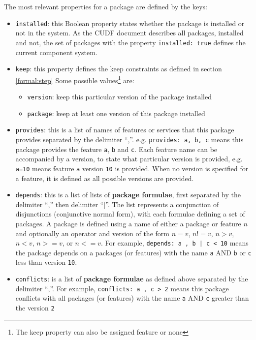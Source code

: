 The most relevant properties for a package are defined by the keys:
\begin{itemize}
  \item \verb+installed+: this Boolean property states whether the package is installed or not in the system. 
  As the CUDF document describes all packages, installed and not, the set of packages with the property \verb+installed: true+ defines the current component system.
  \item \verb+keep+: this property defines the keep constraints as defined in section \ref{formal:step}
  Some possible values\footnote{The keep property can also be assigned feature or none} are:
	  	\begin{itemize}
	  		\item \verb+version+: keep this particular version of the package installed
	  		\item \verb+package+: keep at least one version of this package installed
		\end{itemize}
  \item \verb+provides+: this is a list of names of features or services that this package provides separated by the delimiter ``,''.
  e.g. \verb+provides: a, b, c+ means this package provides the feature \verb+a+, \verb+b+ and \verb+c+.
  Each feature name can be accompanied by a version, to state what particular version is provided, e.g. \verb+a=10+ means feature \verb+a+ version \verb+10+ is provided.
  When no version is specified for a feature, it is defined as all possible versions are provided.
  \item \verb+depends+: this is a list of lists of \textbf{package formulae}, first separated by the delimiter ``,'' then delimiter ``|''.
  The list represents a conjunction of disjunctions (conjunctive normal form), with each formulae defining a set of packages.
  A package is defined using a name of either a package or feature $n$ and optionally an operator and version of the form  $n = v$, $n != v$, $n > v$, $n < v$, $n >= v$, or $n <= v$.
  For example, \verb+depends: a , b | c < 10+ means the package depends on a packages (or features) with the name \verb+a+ AND \verb+b+ or \verb+c+ less than version \verb+10+.  
  \item \verb+conflicts+: is a list of \textbf{package formulae} as defined above separated by the delimiter ``,''.
  For example, \verb+conflicts: a , c > 2+ means this package conflicts with all packages (or features) with the name \verb+a+ AND \verb+c+ greater than the version \verb+2+
\end{itemize}

